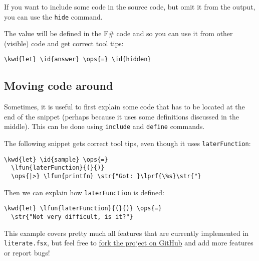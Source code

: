 \documentclass{article}
\newcommand{\id}[1]{\textcolor{black}{#1}}
\newcommand{\kwd}[1]{\textcolor{navy}{#1}}
\newcommand{\ops}[1]{\textcolor{purple}{#1}}
\newcommand{\str}[1]{\textcolor{olive}{#1}}
\begin{document}
If you want to include some code in the source code,
but omit it from the output, you can use the \texttt{hide}
command.


The value will be defined in the F\# code and so you
can use it from other (visible) code and get correct
tool tips:
\begin{Verbatim}[commandchars=\\\{\}]
\kwd{let} \id{answer} \ops{=} \id{hidden}
\end{Verbatim}

\subsection*{Moving code around}



Sometimes, it is useful to first explain some code that
has to be located at the end of the snippet (perhaps
because it uses some definitions discussed in the middle).
This can be done using \texttt{include} and \texttt{define} commands.


The following snippet gets correct tool tips, even though
it uses \texttt{laterFunction}:
\begin{Verbatim}[commandchars=\\\{\}]
\kwd{let} \id{sample} \ops{=} 
  \lfun{laterFunction}{(}{)}
  \ops{|>} \lfun{printfn} \str{"Got: }\lprf{\%s}\str{"}
\end{Verbatim}



Then we can explain how \texttt{laterFunction} is defined:
\begin{Verbatim}[commandchars=\\\{\}]
\kwd{let} \lfun{laterFunction}{(}{)} \ops{=} 
  \str{"Not very difficult, is it?"}
\end{Verbatim}



This example covers pretty much all features that are
currently implemented in \texttt{literate.fsx}, but feel free
to \href{https://github.com/fsprojects/FSharp.Formatting}{fork the project on GitHub} and add more
features or report bugs!
\end{document}
